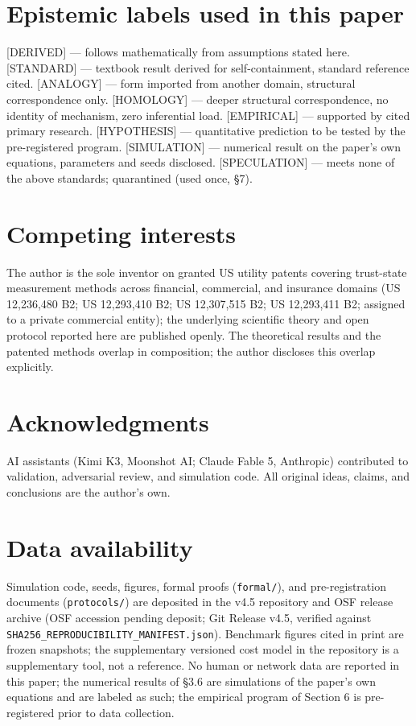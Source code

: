\documentclass[11pt,twocolumn]{article}
\theoremstyle{gttdef}
\theoremstyle{gttplain}
\begin{document}
\section*{Epistemic labels used in this paper}

[DERIVED] --- follows mathematically from assumptions stated here. [STANDARD] --- textbook result derived for self-containment, standard reference cited. [ANALOGY] --- form imported from another domain, structural correspondence only. [HOMOLOGY] --- deeper structural correspondence, no identity of mechanism, zero inferential load. [EMPIRICAL] --- supported by cited primary research. [HYPOTHESIS] --- quantitative prediction to be tested by the pre-registered program. [SIMULATION] --- numerical result on the paper's own equations, parameters and seeds disclosed. [SPECULATION] --- meets none of the above standards; quarantined (used once, \S{}7).

\section*{Competing interests}

The author is the sole inventor on granted US utility patents covering trust-state measurement methods across financial, commercial, and insurance domains (US 12,236,480 B2; US 12,293,410 B2; US 12,307,515 B2; US 12,293,411 B2; assigned to a private commercial entity); the underlying scientific theory and open protocol reported here are published openly. The theoretical results and the patented methods overlap in composition; the author discloses this overlap explicitly.

\section*{Acknowledgments}

AI assistants (Kimi K3, Moonshot AI; Claude Fable 5, Anthropic) contributed to validation, adversarial review, and simulation code. All original ideas, claims, and conclusions are the author's own.

\section*{Data availability}

Simulation code, seeds, figures, formal proofs (\texttt{formal/}), and pre-registration documents (\texttt{protocols/}) are deposited in the v4.5 repository and OSF release archive (OSF accession pending deposit; Git Release v4.5, verified against \texttt{SHA256\_REPRODUCIBILITY\_MANIFEST.json}). Benchmark figures cited in print are frozen snapshots; the supplementary versioned cost model in the repository is a supplementary tool, not a reference. No human or network data are reported in this paper; the numerical results of \S{}3.6 are simulations of the paper's own equations and are labeled as such; the empirical program of Section 6 is pre-registered prior to data collection.
\end{document}
